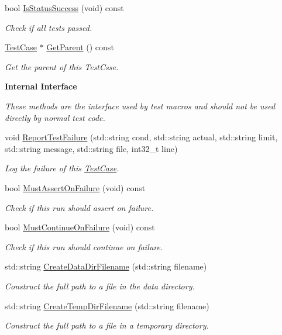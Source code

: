 \begin{DoxyCompactItemize}
bool \hyperlink{classns3_1_1TestCase_a76d97c8d3aadccc6231e50d863cde388}{Is\+Status\+Success} (void) const 
\begin{DoxyCompactList}\small\item\em Check if all tests passed. \end{DoxyCompactList}\item 
\hyperlink{classns3_1_1TestCase}{Test\+Case} $\ast$ \hyperlink{classns3_1_1TestCase_af41db0462b844c9f81838d0e61ecd563}{Get\+Parent} () const 
\begin{DoxyCompactList}\small\item\em Get the parent of this Test\+Csse. \end{DoxyCompactList}\end{DoxyCompactItemize}
\begin{Indent}{\bf Internal Interface}\par
{\em These methods are the interface used by test macros and should not be used directly by normal test code. }\begin{DoxyCompactItemize}
\item 
void \hyperlink{classns3_1_1TestCase_ae4e7f95365ee7b7c152176d9b8de3718}{Report\+Test\+Failure} (std\+::string cond, std\+::string actual, std\+::string limit, std\+::string message, std\+::string file, int32\+\_\+t line)
\begin{DoxyCompactList}\small\item\em Log the failure of this \hyperlink{classns3_1_1TestCase}{Test\+Case}. \end{DoxyCompactList}\item 
bool \hyperlink{classns3_1_1TestCase_ae1d931b18ca994ed0f9630d4e4d8f4e3}{Must\+Assert\+On\+Failure} (void) const 
\begin{DoxyCompactList}\small\item\em Check if this run should assert on failure. \end{DoxyCompactList}\item 
bool \hyperlink{classns3_1_1TestCase_a1e0cc9f95a47dbac232068396bb0bd80}{Must\+Continue\+On\+Failure} (void) const 
\begin{DoxyCompactList}\small\item\em Check if this run should continue on failure. \end{DoxyCompactList}\item 
std\+::string \hyperlink{classns3_1_1TestCase_a3e4d216ff392a43418f26bb3e5b0f16d}{Create\+Data\+Dir\+Filename} (std\+::string filename)
\begin{DoxyCompactList}\small\item\em Construct the full path to a file in the data directory. \end{DoxyCompactList}\item 
std\+::string \hyperlink{classns3_1_1TestCase_a8a04695a6fb9ba0f89e28e9523963f88}{Create\+Temp\+Dir\+Filename} (std\+::string filename)
\begin{DoxyCompactList}\small\item\em Construct the full path to a file in a temporary directory. \end{DoxyCompactList}\end{DoxyCompactItemize}
\end{Indent}
